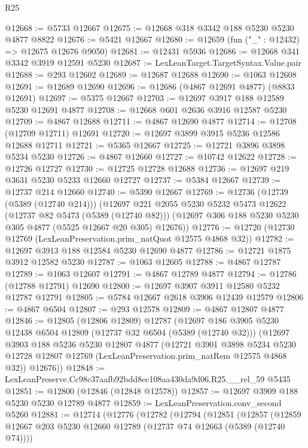 \begin{lexlean}{R25}
\begin{coremodule}
@12668 := @5733 @12667
@12675 := @12668 @318 @3342 @188 @5230 @5230 @4877 @8822
@12676 := @5421 @12667
@12680 := @12659 (fun ("_" : @12432) => @12675 @12676 @9050)
@12681 := @12431 @5936
@12686 := @12668 @341 @3342 @3919 @12591 @5230
@12687 := LexLeanTarget.TargetSyntax.Value.pair
@12688 := @293 @12602
@12689 := @12687 @12688
@12690 := @1063 @12608
@12691 := @12689 @12690
@12696 := @12686 (@4867 @12691 @4877) (@8833 @12691)
@12697 := @5375 @12667
@12703 := @12697 @3917 @188 @12589 @5230 @12691 @4877
@12708 := @12668 @601 @2636 @3916 @12587 @5230
@12709 := @4867 @12688
@12711 := @4867 @12690 @4877
@12714 := @12708 (@12709 @12711) @12691
@12720 := @12697 @3899 @3915 @5236 @12586 @12688 @12711
@12721 := @5365 @12667
@12725 := @12721 @3896 @3898 @5234 @5230
@12726 := @4867 @12660
@12727 := @10742 @12622
@12728 := @12726 @12727
@12730 := @12725 @12728 @12688
@12736 := @12697 @219 @3631 @5230 @5233 @12660 @12727
@12737 := @5384 @12667
@12739 := @12737 @214 @12660
@12740 := @5390 @12667
@12769 := @12736
    (@12739 (@5389 (@12740 @214)))
    (@12697
      @221
      @2055
      @5230
      @5232
      @5473
      @12622
      (@12737 @82 @5473 (@5389 (@12740 @82)))
      (@12697 @306 @188 @5230 @5230 @305 @4877 (@5525 @12667 @20 @305) @12676))
@12776 := @12720 (@12730 @12769 (LexLeanPreservation.prim_natQuot @12575 @4868 @32))
@12782 := @12697 @3913 @188 @12584 @5230 @12690 @4877
@12786 := @12721 @1875 @3912 @12582 @5230
@12787 := @1063 @12605
@12788 := @4867 @12787
@12789 := @1063 @12607
@12791 := @4867 @12789 @4877
@12794 := @12786 (@12788 @12791) @12690
@12800 := @12697 @3907 @3911 @12580 @5232 @12787 @12791
@12805 := @5784 @12667 @2618 @3906 @12439 @12579
@12806 := @4867 @6504
@12807 := @293 @12578
@12809 := @4867 @12807 @4877
@12846 := @12805
    (@12806 @12809)
    @12787
    (@12697
      @186
      @3905
      @5230
      @12438
      @6504
      @12809
      (@12737 @32 @6504 (@5389 (@12740 @32)))
      (@12697
        @3903
        @188
        @5236
        @5230
        @12807
        @4877
        (@12721
          @3901
          @3898
          @5234
          @5230
          @12728
          @12807
          @12769
          (LexLeanPreservation.prim_natRem @12575 @4868 @32))
        @12676))
@12848 := LexLeanPreserve.Cc98c37aafb92bdd8ec108aa430da9d06.R25.__rel_59 @5435
@12851 := @12800 (@12846 (@12848 @12578))
@12857 := @12697 @3909 @188 @5230 @5230 @12789 @4877
@12859 := LexLeanPreservation.conv_second @5260
@12881 := @12714
    (@12776
      (@12782
        (@12794
          (@12851
            (@12857
              (@12859 @12667 @203 @5230 @12660 @12789 (@12737 @74 @12663 (@5389 (@12740 @74))))

\end{coremodule}
\end{lexlean}
